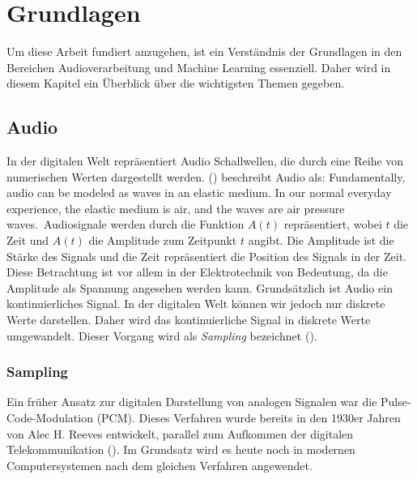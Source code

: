 \documentclass[11pt,a4paper]{article}
\begin{document}
\newpage \section{Grundlagen}
Um diese Arbeit fundiert anzugehen, ist ein Verständnis der Grundlagen in den Bereichen
Audioverarbeitung und Machine Learning essenziell. Daher wird in diesem Kapitel ein Überblick
über die wichtigsten Themen gegeben.

\subsection{Audio}
In der digitalen Welt repräsentiert Audio Schallwellen, die durch eine Reihe von numerischen Werten
dargestellt werden. (\cite[p.9]{somberg2019audioapi}) beschreibt Audio als: \glqq Fundamentally,
audio can be modeled as waves in an elastic medium. In our normal everyday experience, the elastic
medium is air, and the waves are air pressure waves.\grqq \ Audiosignale werden durch die Funktion
\(A(t)\) repräsentiert, wobei \(t\) die Zeit und \(A(t)\) die Amplitude zum
Zeitpunkt \(t\) angibt. Die Amplitude ist die Stärke des Signals und die Zeit repräsentiert die
Position des Signals in der Zeit. Diese Betrachtung ist vor allem in der Elektrotechnik
von Bedeutung, da die Amplitude als Spannung angesehen werden kann. Grundsätzlich ist Audio ein
kontinuierliches Signal. In der digitalen Welt können wir jedoch nur diskrete Werte darstellen.
Daher wird das kontinuierliche Signal in diskrete Werte umgewandelt. Dieser Vorgang wird als
\textit{Sampling} bezeichnet (\cite[Chapter~3.1]{tarr2018hackaudio}).


\subsubsection{Sampling}
Ein früher Ansatz zur digitalen Darstellung von analogen Signalen war die Pulse-Code-Modulation
(PCM). Dieses Verfahren wurde bereits in den 1930er Jahren von Alec H. Reeves entwickelt,
parallel zum Aufkommen der digitalen Telekommunikation (\cite[p.~57]{deloraine1965pcm}).
Im Grundsatz wird es heute noch in modernen Computersystemen nach dem gleichen Verfahren angewendet.
\end{document}
